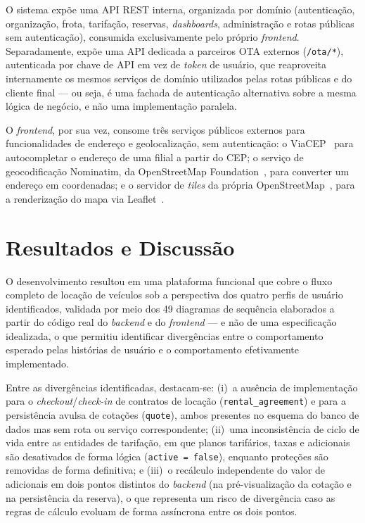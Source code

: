 \documentclass[conference,a4paper]{IEEEtran}
\newcommand{\code}[1]{\texttt{#1}}
\begin{document}
O sistema expõe uma API REST interna, organizada por domínio (autenticação, organização, frota, tarifação, reservas, \textit{dashboards}, administração e rotas públicas sem autenticação), consumida exclusivamente pelo próprio \textit{frontend}. Separadamente, expõe uma API dedicada a parceiros OTA externos (\code{/ota/*}), autenticada por chave de API em vez de \textit{token} de usuário, que reaproveita internamente os mesmos serviços de domínio utilizados pelas rotas públicas e do cliente final --- ou seja, é uma fachada de autenticação alternativa sobre a mesma lógica de negócio, e não uma implementação paralela.

O \textit{frontend}, por sua vez, consome três serviços públicos externos para funcionalidades de endereço e geolocalização, sem autenticação: o ViaCEP~\cite{viacep} para autocompletar o endereço de uma filial a partir do CEP; o serviço de geocodificação Nominatim, da OpenStreetMap Foundation~\cite{osm}, para converter um endereço em coordenadas; e o servidor de \textit{tiles} da própria OpenStreetMap~\cite{osm}, para a renderização do mapa via Leaflet~\cite{leaflet}.

\section{Resultados e Discussão}

O desenvolvimento resultou em uma plataforma funcional que cobre o fluxo completo de locação de veículos sob a perspectiva dos quatro perfis de usuário identificados, validada por meio dos 49 diagramas de sequência elaborados a partir do código real do \textit{backend} e do \textit{frontend} --- e não de uma especificação idealizada, o que permitiu identificar divergências entre o comportamento esperado pelas histórias de usuário e o comportamento efetivamente implementado.

Entre as divergências identificadas, destacam-se: (i)~a ausência de implementação para o \textit{checkout}/\textit{check-in} de contratos de locação (\code{rental\_agreement}) e para a persistência avulsa de cotações (\code{quote}), ambos presentes no esquema do banco de dados mas sem rota ou serviço correspondente; (ii)~uma inconsistência de ciclo de vida entre as entidades de tarifação, em que planos tarifários, taxas e adicionais são desativados de forma lógica (\code{active = false}), enquanto proteções são removidas de forma definitiva; e (iii)~o recálculo independente do valor de adicionais em dois pontos distintos do \textit{backend} (na pré-visualização da cotação e na persistência da reserva), o que representa um risco de divergência caso as regras de cálculo evoluam de forma assíncrona entre os dois pontos.
\end{document}
